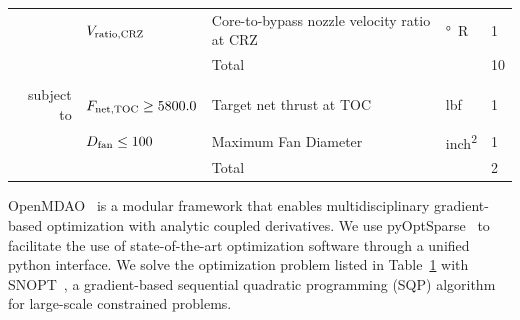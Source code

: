 \documentclass[conf]{new-aiaa}
\begin{document}
\begin{table}[hbt!]
\begin{tabular}{r l l l l}
                        & $V_{\rm{ratio,CRZ}}$           & Core-to-bypass nozzle velocity ratio at CRZ & \unit{\degree R} & 1        \\
        \cline{3-5}
                        &                                & Total                                       &                  & 10       \\
                        &                                &                                             &                  &          \\
        subject to      & $F_{\rm{net,TOC}} \geq 5800.0$ & Target net thrust at TOC                    & \unit{lbf}       & 1        \\
                        & $D_{\rm{fan}} \leq 100$        & Maximum Fan Diameter                        & \unit{inch^2}    & 1        \\
        \cline{3-5}
                        &                                & Total                                       &                  & 2        \\
        \bottomrule
    \end{tabular}
    \label{tab:opt_problem}
\end{table}

OpenMDAO~\cite{Gray2019a} is a modular framework that enables multidisciplinary gradient-based optimization with analytic coupled derivatives.
We use pyOptSparse~\cite{Wu2020a} to facilitate the use of state-of-the-art optimization software through a unified python interface.
We solve the optimization problem listed in Table~\ref{tab:opt_problem} with SNOPT~\cite{Gill2005a}, a gradient-based sequential quadratic programming (SQP) algorithm for large-scale constrained problems.

\end{document}
